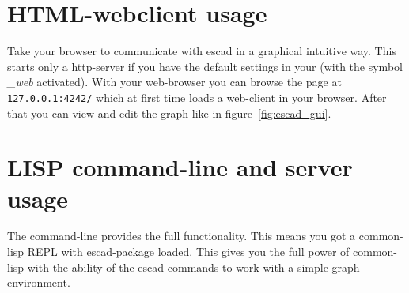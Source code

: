\documentclass[a4paper, 12pt, openany]{scrbook}
\begin{document}
\section{HTML-webclient usage}
Take your browser to communicate with escad in a graphical intuitive way. This starts only a http-server if you have the default settings in your  (with the symbol \emph{\_web} activated). With your web-browser you can browse the page at \texttt{127.0.0.1:4242/} which at first time loads a web-client in your browser. After that you can view and edit the graph like in figure~\ref{fig:escad_gui}.
\section{LISP command-line and server usage}\label{sec:cmd_line}
The command-line provides the full functionality. This means you got a common-lisp REPL with escad-package loaded. This gives you the full power of common-lisp with the ability of the escad-commands to work with a simple graph environment.
\end{document}
